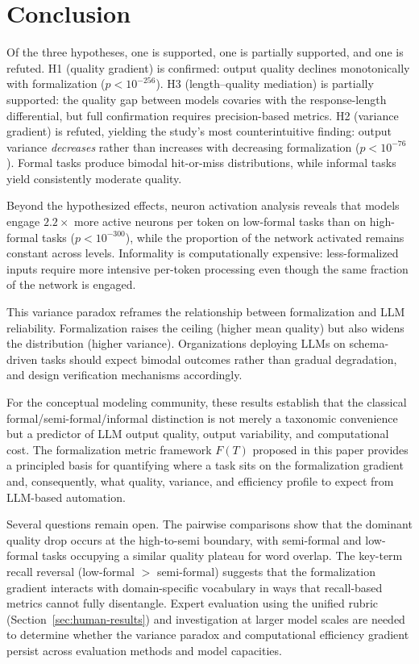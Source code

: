 \documentclass[runningheads]{llncs}
\begin{document}
\section{Conclusion}
\label{sec:conclusion}

Of the three hypotheses, one is supported, one is partially supported, and one is refuted. H1 (quality gradient) is confirmed: output quality declines monotonically with formalization ($p < 10^{-256}$). H3 (length--quality mediation) is partially supported: the quality gap between models covaries with the response-length differential, but full confirmation requires precision-based metrics. H2 (variance gradient) is refuted, yielding the study's most counterintuitive finding: output variance \emph{decreases} rather than increases with decreasing formalization ($p < 10^{-76}$). Formal tasks produce bimodal hit-or-miss distributions, while informal tasks yield consistently moderate quality.

Beyond the hypothesized effects, neuron activation analysis reveals that models engage $2.2\times$ more active neurons per token on low-formal tasks than on high-formal tasks ($p < 10^{-300}$), while the proportion of the network activated remains constant across levels. Informality is computationally expensive: less-formalized inputs require more intensive per-token processing even though the same fraction of the network is engaged.

This variance paradox reframes the relationship between formalization and LLM reliability. Formalization raises the ceiling (higher mean quality) but also widens the distribution (higher variance). Organizations deploying LLMs on schema-driven tasks should expect bimodal outcomes rather than gradual degradation, and design verification mechanisms accordingly.

For the conceptual modeling community, these results establish that the classical formal/semi-formal/informal distinction \cite{mylopoulos1992conceptual} is not merely a taxonomic convenience but a predictor of LLM output quality, output variability, and computational cost. The formalization metric framework $F(T)$ proposed in this paper provides a principled basis for quantifying where a task sits on the formalization gradient and, consequently, what quality, variance, and efficiency profile to expect from LLM-based automation.

Several questions remain open. The pairwise comparisons show that the dominant quality drop occurs at the high-to-semi boundary, with semi-formal and low-formal tasks occupying a similar quality plateau for word overlap. The key-term recall reversal (low-formal $>$ semi-formal) suggests that the formalization gradient interacts with domain-specific vocabulary in ways that recall-based metrics cannot fully disentangle. Expert evaluation using the unified rubric (Section~\ref{sec:human-results}) and investigation at larger model scales are needed to determine whether the variance paradox and computational efficiency gradient persist across evaluation methods and model capacities.
\end{document}

